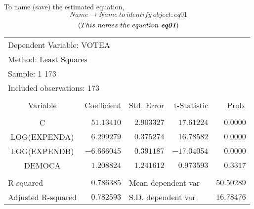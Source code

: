 \documentclass[12pt]{report}
\begin{document}
\noindent To name (save) the estimated equation,
$$Name \to Name\ to\ identify\ object: eq01$$
$$(This\ names\ the\ equation\ \textit{\textbf{eq01}})$$
\begin{figure}[H]
	\centering
\end{figure}
\vspace{-\baselineskip}
\begin{figure}[H]
	\centering
\end{figure}
\vspace{-\baselineskip}
\begin{table}[H]
	\centering
	\begin{tabular}{lrrrr}
		\multicolumn{3}{l}{Dependent Variable: VOTEA}&\multicolumn{1}{c}{}&\multicolumn{1}{c}{}\\
		\multicolumn{3}{l}{Method: Least Squares}&\multicolumn{1}{c}{}&\multicolumn{1}{c}{}\\
		\multicolumn{2}{l}{Sample: 1 173}&\multicolumn{1}{c}{}&\multicolumn{1}{c}{}&\multicolumn{1}{c}{}\\
		\multicolumn{3}{l}{Included observations: 173}&\multicolumn{1}{c}{}&\multicolumn{1}{c}{}\\
		[4.5pt] \hline \\ [-4.5pt]
		\multicolumn{1}{c}{Variable}&\multicolumn{1}{r}{Coefficient}&\multicolumn{1}{r}{Std. Error}&\multicolumn{1}{r}{t-Statistic}&\multicolumn{1}{r}{Prob.}\\
		[4.5pt] \hline \\ [-4.5pt]
		\multicolumn{1}{c}{C}&\multicolumn{1}{r}{$51.13410$}&\multicolumn{1}{r}{$2.903327$}&\multicolumn{1}{r}{$17.61224$}&\multicolumn{1}{r}{$0.0000$}\\
		\multicolumn{1}{c}{LOG(EXPENDA)}&\multicolumn{1}{r}{$6.299279$}&\multicolumn{1}{r}{$0.375274$}&\multicolumn{1}{r}{$16.78582$}&\multicolumn{1}{r}{$0.0000$}\\
		\multicolumn{1}{c}{LOG(EXPENDB)}&\multicolumn{1}{r}{$-6.666045$}&\multicolumn{1}{r}{$0.391187$}&\multicolumn{1}{r}{$-17.04054$}&\multicolumn{1}{r}{$0.0000$}\\
		\multicolumn{1}{c}{DEMOCA}&\multicolumn{1}{r}{$1.208824$}&\multicolumn{1}{r}{$1.241612$}&\multicolumn{1}{r}{$0.973593$}&\multicolumn{1}{r}{$0.3317$}\\
		[4.5pt] \hline \\ [-4.5pt]
		\multicolumn{1}{l}{R-squared}&\multicolumn{1}{r}{$0.786385$}&\multicolumn{2}{l}{Mean dependent var}&\multicolumn{1}{r}{$50.50289$}\\
		\multicolumn{1}{l}{Adjusted R-squared}&\multicolumn{1}{r}{$0.782593$}&\multicolumn{2}{l}{S.D. dependent var}&\multicolumn{1}{r}{$16.78476$}\\

\end{tabular}
\end{table}
\end{document}
